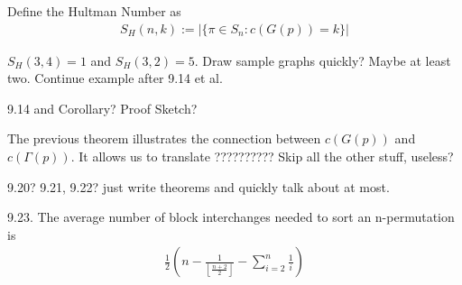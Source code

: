\begin{definition}
Define the Hultman Number as
\begin{align*}
S_H(n,k) := | \{ \pi \in S_n : c(G(p)) = k \} |
\end{align*}
\end{definition}

\begin{example}
$S_H(3,4) = 1$ and $S_H(3,2)=5$.
Draw sample graphs quickly? Maybe at least two.
Continue example after 9.14 et al.
\end{example}


\begin{theorem}
9.14 and Corollary? Proof Sketch?
\end{theorem}

\begin{remark}
The previous theorem illustrates the connection between $c(G(p))$ and $c(\Gamma (p))$. It allows us to translate ?????????? Skip all the other stuff, useless?
\end{remark}

\begin{theorem}
9.20? 9.21, 9.22? just write theorems and quickly talk about at most.
\end{theorem}

\begin{theorem}
9.23. The average number of block interchanges needed to sort an n-permutation is
\begin{align*}
\frac{1}{2} (n- \frac{1}{ \left \lfloor{\frac{n+2}{2}}\right \rfloor} - \sum^n_{i=2} \frac{1}{i} )
\end{align*}
\end{theorem}

\begin{appendix}


\end{appendix}

